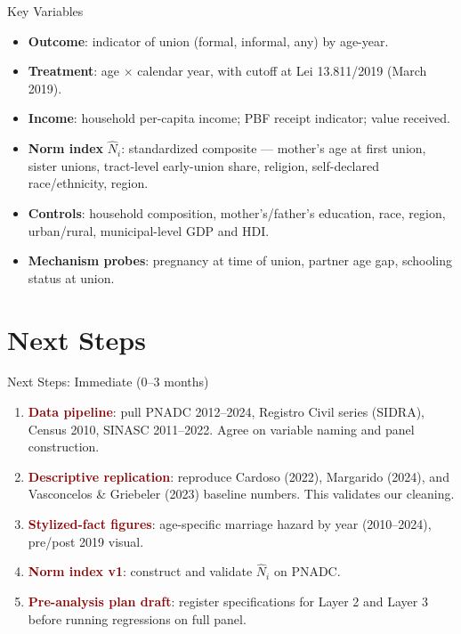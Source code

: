 \documentclass[aspectratio=169,10pt]{beamer}
\newcommand{\hl}[1]{\textcolor{darkred}{\textbf{#1}}}
\begin{document}
\begin{frame}{Key Variables}
    \begin{itemize}
        \item \textbf{Outcome}: indicator of union (formal, informal, any) by age-year.
        \item \textbf{Treatment}: age $\times$ calendar year, with cutoff at Lei 13.811/2019 (March 2019).
        \item \textbf{Income}: household per-capita income; PBF receipt indicator; value received.
        \item \textbf{Norm index} $\widehat{N}_i$: standardized composite --- mother's age at first union, sister unions, tract-level early-union share, religion, self-declared race/ethnicity, region.
        \item \textbf{Controls}: household composition, mother's/father's education, race, region, urban/rural, municipal-level GDP and HDI.
        \item \textbf{Mechanism probes}: pregnancy at time of union, partner age gap, schooling status at union.
    \end{itemize}
\end{frame}

\section{Next Steps}

\begin{frame}{Next Steps: Immediate (0--3 months)}
    \begin{enumerate}
        \item \hl{Data pipeline}: pull PNADC 2012--2024, Registro Civil series (SIDRA), Census 2010, SINASC 2011--2022. Agree on variable naming and panel construction.
        \item \hl{Descriptive replication}: reproduce Cardoso (2022), Margarido (2024), and Vasconcelos \& Griebeler (2023) baseline numbers. This validates our cleaning.
        \item \hl{Stylized-fact figures}: age-specific marriage hazard by year (2010--2024), pre/post 2019 visual.
        \item \hl{Norm index v1}: construct and validate $\widehat{N}_i$ on PNADC.
        \item \hl{Pre-analysis plan draft}: register specifications for Layer 2 and Layer 3 before running regressions on full panel.
    \end{enumerate}
\end{frame}
\end{document}

